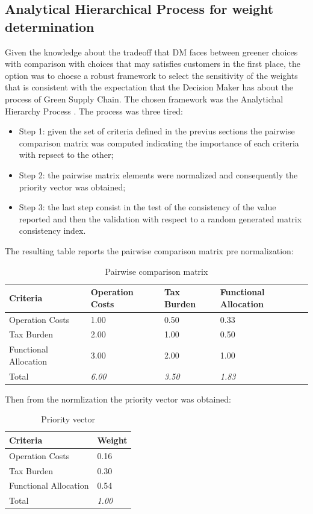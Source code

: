 \documentclass{article}
\begin{document}
\subsection{Analytical Hierarchical Process for weight determination}
Given the knowledge about the tradeoff that DM faces between greener choices with comparison with choices that may satisfies customers in the first place, the option was to choese a robust framework to select the sensitivity of the weights that is consistent with the expectation that the Decision Maker has about the process of Green Supply Chain. The chosen framework was the Analytichal Hierarchy Process \cite{Saaty1980}. The process was three tired:
\begin{itemize}
	\item Step 1: given the set of criteria defined in the previus sections the pairwise comparison matrix was computed indicating the importance of each criteria with repsect to the other;
	\item Step 2: the pairwise matrix elements were normalized and consequently the priority vector was obtained;
	\item Step 3: the last step consist in the test of the consistency of the value reported and then the validation with respect to a random generated matrix consistency index.
\end{itemize}
The resulting table reports the pairwise comparison matrix pre normalization:

\begin{table}[ht]
\centering
\begin{tabular}{@{}llll@{}}
\toprule
\textbf{Criteria}     & Operation Costs & Tax Burden    & Functional Allocation \\ \midrule
Operation Costs       & 1.00            & 0.50          & 0.33                  \\
Tax Burden            & 2.00            & 1.00          & 0.50                  \\
Functional Allocation & 3.00            & 2.00          & 1.00                  \\
Total                 & \textit{6.00}   & \textit{3.50} & \textit{1.83}         \\ \bottomrule
\end{tabular}
\caption{Pairwise comparison matrix}
\end{table}

Then from the normlization the priority vector was obtained:

\begin{table}[]
\centering
\begin{tabular}{@{}ll@{}}
\toprule
\textbf{Criteria}     & Weight        \\ \midrule
Operation Costs       & 0.16          \\
Tax Burden            & 0.30          \\
Functional Allocation & 0.54          \\
Total                 & \textit{1.00} \\ \bottomrule
\end{tabular}
\caption{Priority vector}
\end{table}
\end{document}

